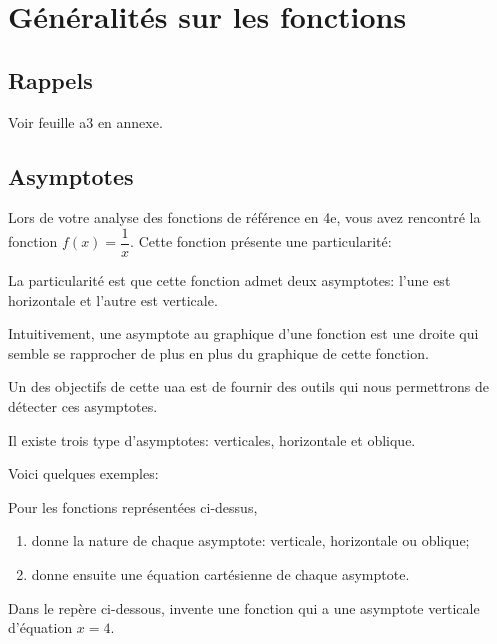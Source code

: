 \documentclass[a4paper,12pt]{report}
\begin{document}
\chapter{Généralités sur les fonctions}
\label{sec:org7b2e85c}
\section{Rappels}
\label{sec:orgcd02b42}
Voir feuille a3 en annexe.
\section{Asymptotes}
\label{sec:orga6f44bf}
Lors de votre analyse des fonctions de référence en 4e, vous avez rencontré la
fonction \(f(x)=\dfrac{1}{x}\). Cette fonction présente une particularité:
\begin{center}

\end{center}

La particularité est que cette fonction admet deux asymptotes: l'une est
horizontale et l'autre est verticale.

Intuitivement, une asymptote au graphique d'une fonction est une droite qui
semble se rapprocher de plus en plus du graphique de cette fonction.

Un des objectifs de cette uaa est de fournir des outils qui nous permettrons de
détecter ces asymptotes.

Il existe trois type d'asymptotes: verticales, horizontale et oblique.

Voici quelques exemples:
\begin{center}

\end{center}

\begin{exercice}
Pour les fonctions représentées ci-dessus,

\begin{enumerate}
\item donne la nature de chaque asymptote: verticale, horizontale ou oblique;
\item donne ensuite une équation cartésienne de chaque asymptote.
\end{enumerate}
\end{exercice}

\begin{exercice}
Dans le repère ci-dessous, invente une fonction qui a une asymptote verticale
d'équation \(x=4\).
\begin{center}

\end{center}
\end{exercice}
\end{document}
